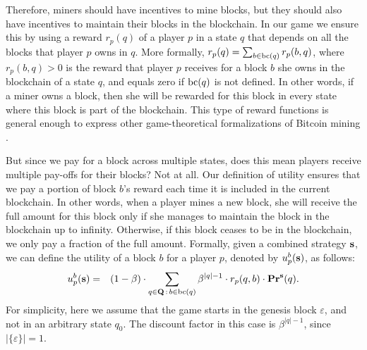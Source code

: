 %
%
%
%
%

Therefore, miners should have incentives to mine blocks, but they should also have incentives to maintain their blocks in the blockchain. In our game we 
ensure this by using a reward $r_p(q)$ of a player $p$ in a state $q$ that depends on all the blocks that player $p$ owns in $q$. More formally, $r_p(q)= \sum_{b \in \text{bc}(q)} r_p(b,q)$, where $r_p(b,q) > 0$ is the reward that player $p$ receives for a block $b$ she owns in the blockchain of a state $q$, and equals zero if $\text{bc}(q)$ is not defined. In other words, if a miner owns a block, then she will be rewarded for this block in every state where this block is part of the blockchain. This type of reward functions is general enough to express other game-theoretical formalizations of Bitcoin mining \cite{mininggames:2016}.

But since we pay for a block across multiple states, does this mean players receive multiple pay-offs for their blocks? Not at all. 
Our definition of utility ensures that we pay a portion of block $b$'s reward each time it is included in the current blockchain. In other words, 
when a player mines a new block, she will receive the full amount for this block only if she manages to maintain the block in the blockchain up to infinity. Otherwise, if this block 
ceases to be in the blockchain, we only pay a fraction of the full amount. Formally, given a combined strategy $\mathbf{s}$, we can define the utility of a block $b$ for a player $p$, denoted by $u_p^b(\mathbf{s})$,  as follows:
\begin{eqnarray*}
u_p^b(\mathbf{s}) & =  & (1 - \beta) \cdot  \sum_{q \in \mathbf{Q} \,:\, b \in \text{bc}(q)} \beta^{|q|-1} \cdot  r_p(q,b) \cdot \mathbf{Pr}^{\mathbf{s}}(q).
\end{eqnarray*}
For simplicity, here we assume that the game starts in the genesis block $\varepsilon$, and not in an arbitrary state $q_0$. The discount factor in this case is $\beta^{|q|-1}$, since $|\{\varepsilon\}|= 1$.  


